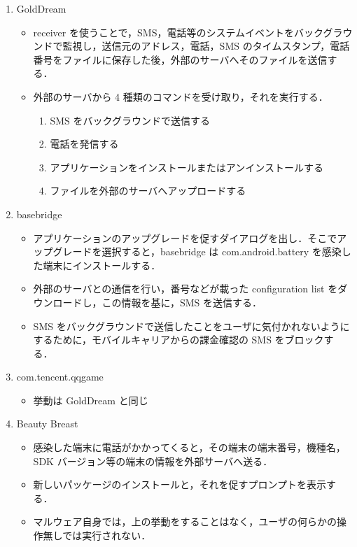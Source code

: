 \begin{enumerate}
\item GoldDream
	\begin{itemize}
	\item	receiver を使うことで，SMS，電話等のシステムイベントをバックグラウンドで監視し，送信元のアドレス，電話，SMS のタイムスタンプ，電話番号をファイルに保存した後，外部のサーバへそのファイルを送信する．
	\item 外部のサーバから 4 種類のコマンドを受け取り，それを実行する．
	\begin{enumerate}
		\item SMS をバックグラウンドで送信する
		\item 電話を発信する
		\item アプリケーションをインストールまたはアンインストールする
		\item ファイルを外部のサーバへアップロードする
	\end{enumerate}
	\end{itemize}

\item basebridge
	\begin{itemize}
	\item アプリケーションのアップグレードを促すダイアログを出し．そこでアップグレードを選択すると，basebridge は com.android.battery を感染した端末にインストールする．
	\item 外部のサーバとの通信を行い，番号などが載った configuration list  をダウンロードし，この情報を基に，SMS を送信する．
	\item SMS をバックグラウンドで送信したことをユーザに気付かれないようにするために，モバイルキャリアからの課金確認の SMS をブロックする．
	\end{itemize}

\item com.tencent.qqgame
	\begin{itemize}
	\item 挙動は GoldDream と同じ
	\end{itemize}

\item Beauty Breast
	\begin{itemize}
	\item 感染した端末に電話がかかってくると，その端末の端末番号，機種名，SDK バージョン等の端末の情報を外部サーバへ送る．
	\item 新しいパッケージのインストールと，それを促すプロンプトを表示する．
	\item マルウェア自身では，上の挙動をすることはなく，ユーザの何らかの操作無しでは実行されない．
	\end{itemize}


\end{enumerate}
